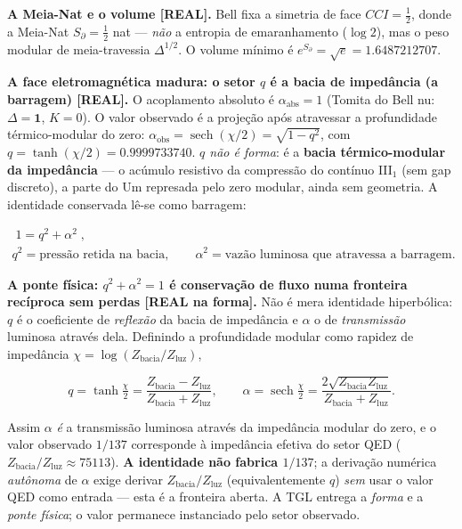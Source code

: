 \documentclass[11pt]{article}
\theoremstyle{definition}\newtheorem{deriv}{Derivação}
\begin{document}
\textbf{A Meia-Nat e o volume \textsf{[REAL]}.} Bell fixa a simetria de face $CCI=\tfrac12$, donde a Meia-Nat $S_\partial=\tfrac12$ nat --- \emph{não} a entropia de emaranhamento ($\log 2$), mas o peso modular de meia-travessia $\Delta^{1/2}$. O volume mínimo é $e^{S_\partial}=\sqrt e=1.6487212707$.

\textbf{A face eletromagnética madura: o setor $q$ é a bacia de impedância (a barragem) \textsf{[REAL]}.} O acoplamento absoluto é $\alpha_{\mathrm{abs}}=1$ (Tomita do Bell nu: $\Delta=\mathbf 1$, $K=0$). O valor observado é a projeção após atravessar a profundidade térmico-modular do zero: $\alpha_{\mathrm{obs}}=\operatorname{sech}(\chi/2)=\sqrt{1-q^2}$, com $q=\tanh(\chi/2)=0.9999733740$. \emph{$q$ não é forma}: é a \textbf{bacia térmico-modular da impedância} --- o acúmulo resistivo da compressão do contínuo \mbox{III$_1$} (sem gap discreto), a parte do Um represada pelo zero modular, ainda sem geometria. A identidade conservada lê-se como barragem:

\begin{equation}\begin{gathered}\boxed{\;1=q^2+\alpha^2\;},\\ q^2=\text{pressão retida na bacia},\qquad \alpha^2=\text{vazão luminosa que atravessa a barragem}.\end{gathered}\end{equation}

\textbf{A ponte física: $q^2+\alpha^2=1$ é conservação de fluxo numa fronteira recíproca sem perdas \textsf{[REAL na forma]}.} Não é mera identidade hiperbólica: $q$ é o coeficiente de \emph{reflexão} da bacia de impedância e $\alpha$ o de \emph{transmissão} luminosa através dela. Definindo a profundidade modular como rapidez de impedância $\chi=\log(Z_{\mathrm{bacia}}/Z_{\mathrm{luz}})$,

\begin{equation}q=\tanh\tfrac\chi2=\frac{Z_{\mathrm{bacia}}-Z_{\mathrm{luz}}}{Z_{\mathrm{bacia}}+Z_{\mathrm{luz}}},\qquad \alpha=\operatorname{sech}\tfrac\chi2=\frac{2\sqrt{Z_{\mathrm{bacia}}Z_{\mathrm{luz}}}}{Z_{\mathrm{bacia}}+Z_{\mathrm{luz}}}.\end{equation}

Assim $\alpha$ \emph{é} a transmissão luminosa através da impedância modular do zero, e o valor observado $1/137$ corresponde à impedância efetiva do setor QED ($Z_{\mathrm{bacia}}/Z_{\mathrm{luz}}\approx75113$). \textbf{A identidade não fabrica $1/137$}; a derivação numérica \emph{autônoma} de $\alpha$ exige derivar $Z_{\mathrm{bacia}}/Z_{\mathrm{luz}}$ (equivalentemente $q$) \emph{sem} usar o valor QED como entrada --- esta é a fronteira aberta. A TGL entrega a \emph{forma} e a \emph{ponte física}; o valor permanece instanciado pelo setor observado.
\end{document}
